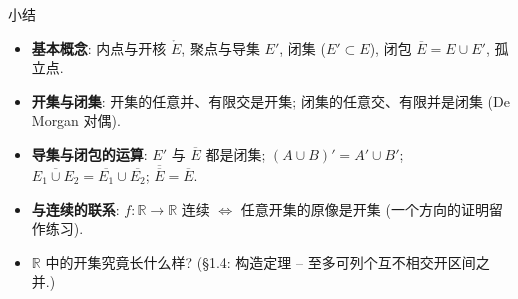 \begin{frame}{小结}

\begin{itemize}
\item \textbf{基本概念}: 内点与开核 $\mathring{E}$, 聚点与导集 $E'$, 闭集 ($E' \subset E$),
闭包 $\overline{E} = E \cup E'$, 孤立点.
\item \textbf{开集与闭集}: 开集的任意并、有限交是开集; 闭集的任意交、有限并是闭集 (De Morgan 对偶).
\item \textbf{导集与闭包的运算}: $E'$ 与 $\overline{E}$ 都是闭集; $(A \cup B)' = A' \cup B'$;
$\overline{E_1 \cup E_2} = \overline{E_1} \cup \overline{E_2}$; $\overline{\overline{E}} = \overline{E}$.
\item \textbf{与连续的联系}: $f: \mathbb{R} \to \mathbb{R}$ 连续 $\iff$ 任意开集的原像是开集 (一个方向的证明留作练习).
\end{itemize}

\pause

\begin{question}
\begin{itemize}
\item $\mathbb{R}$ 中的开集究竟长什么样? (§1.4: 构造定理 -- 至多可列个互不相交开区间之并.)
\end{itemize}
\end{question}

\end{frame}


